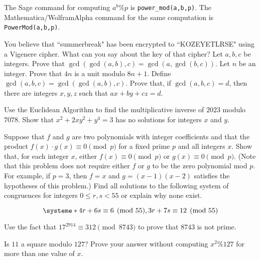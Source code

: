 \documentclass[11pt,addpoints,letterpaper]{exam}
\begin{document}
The Sage command for computing $a^b\%p$ is \verb|power_mod(a,b,p)|. The Mathematica/WolframAlpha command for the same computation is \verb|PowerMod(a,b,p)|. 
\vfill





\newpage

\begin{questions}
\question You believe that ``summerbreak" has been encrypted to ``KOZEYETLRSE" using a Vigenere cipher. What can you say about the key of that cipher?
\vfill 
\question Let $a,b,c$ be integers. Prove that $\gcd(\gcd(a,b),c)=\gcd(a,\gcd(b,c))$. 
\vfill
\newpage
\question Let $n$ be an integer. Prove that $4n$ is a unit modulo $8n+1$. 
\vfill 
\question Define $\gcd(a,b,c)=\gcd(\gcd(a,b),c).$ Prove that, if $\gcd(a,b,c)=d$, then there are integers $x,y,z$ such that $ax+by+cz=d$. 

\vfill
\newpage

\question Use the Euclidean Algorithm to find the multiplicative inverse of $2023$ modulo $7078$.
\vfill 
\question Show that $x^2+2xy^2+y^4=3$ has no solutions for integers $x$ and $y$. 
\vfill
 \newpage


\question Suppose that $f$ and $g$ are two polynomials with integer coefficients and that the product $f(x)\cdot g(x)\equiv 0\pmod{p}$ for a fixed prime $p$ and all integers $x$. Show that, for each integer $x$, either $f(x)\equiv 0\pmod{p}$ or $g(x)\equiv 0\pmod{p}$. (Note that this problem does not require either $f$ or $g$ to be the zero polynomial mod $p$. For example, if $p=3$, then $f=x$ and $g=(x-1)(x-2)$ satisfies the hypotheses of this problem.)
\vfill
\newpage
\question Find all solutions to the following system of congruences for integers $0\le r,s<55$ or explain why none exist. 

$$\systeme*{4r+6s\equiv 6 \pmod{55}, 3r+7s\equiv 12\pmod{55}}$$

 \vfill

    \newpage
\question Use the fact that $17^{2914}\equiv 312\pmod{8743}$ to prove that $8743$ is not prime. 

\vfill 
   \question Is $11$ a square modulo $127$? Prove your answer without computing $x^2\%127$ for more than one value of $x$.  

\vfill

          
          
          \bigskip
   
  


\end{questions}
\end{document}
